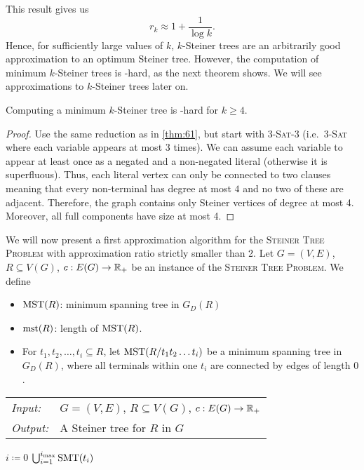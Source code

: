 \documentclass[../skript.tex]{subfiles}
\begin{document}
This result gives us
\[
	r_k \approx 1 + \frac{1}{\log k}.
\]
Hence, for sufficiently large values of $k$, $k$-Steiner trees are an arbitrarily good approximation to an optimum Steiner tree. However, the computation of minimum $k$-Steiner trees is \NP-hard, as the next theorem shows. We will see approximations to $k$-Steiner trees later on.
\begin{theorem} %
\label{thm:74}
Computing a minimum $k$-Steiner tree is \NP-hard for $k \geq 4$.
\end{theorem}
\begin{proof}
Use the same reduction as in \cref{thm:61}, but start with 3-\textsc{Sat}-3 (i.e.\ 3-\textsc{Sat} where each variable appears at most 3 times). We can assume each variable to appear at least once as a negated and a non-negated literal (otherwise it is superfluous). Thus, each literal vertex can only be connected to two clauses meaning that every non-terminal has degree at most $4$ and no two of these are adjacent. Therefore, the graph contains only Steiner vertices of degree at most 4. Moreover, all full components have size at most 4.
\end{proof}
We will now present a first approximation algorithm for the \textsc{Steiner Tree Problem} with approximation ratio strictly smaller than 2.
Let $G = (V, E)$, $R \subseteq V(G)$, $c : E(G) \to \mathbb{R}_+$ be an instance of the \textsc{Steiner Tree Problem}. We define
\begin{itemize}
\item $\operatorname{MST}(R)$: minimum spanning tree in $G_D(R)$
\item $\operatorname{mst}(R)$: length of $\operatorname{MST}(R)$.
\item For $t_1, t_2, \ldots, t_i \subseteq R$, let $\operatorname{MST}(R/t_1 t_2 \ldots t_i)$ be a minimum spanning tree in $G_D(R)$, where all terminals within one $t_i$ are connected by edges of length $0$.
\end{itemize}
\begin{algorithmbox}
\begin{tabular}{@{}ll}
\textit{Input:} & $G = (V, E)$, $R \subseteq V(G)$, $c : E(G) \to \mathbb{R}_+$\\
\textit{Output:} & A Steiner tree for $R$ in $G$
\end{tabular}
\end{algorithmbox}
\vspace{-7pt}
\begin{algorithm}[H]
$i \coloneqq 0$\;
\Return $\bigcup_{i=1}^{i_{\max}} \operatorname{SMT}(t_i)$\;
\end{algorithm}
\end{document}
